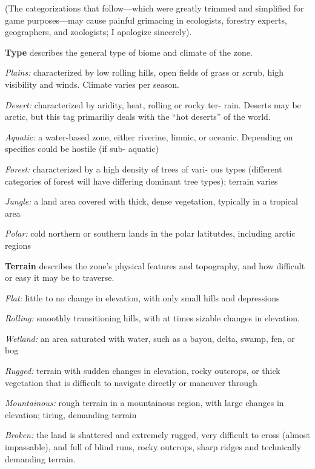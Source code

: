 \documentclass[oneside,10pt]{article}
\begin{document}
\begin{multicols}{2}
(The categorizations that follow—which were greatly trimmed
and simplified for game purposes—may cause painful grimacing in ecologists, forestry experts, geographers, and zoologists; I apologize sincerely).

\textbf{Type} describes the general type of biome and climate of the 
zone. 
\begin{dent}

\textit{Plains:} characterized by low rolling hills, open fields of 
grass or scrub, high visibility and winds. Climate varies per 
season. 

\textit{Desert:} characterized by aridity, heat, rolling or rocky ter- 
rain. Deserts may be arctic, but this tag primariliy deals 
with the ``hot deserts'' of the world. 

    \textit{Aquatic:} a water-based zone, either riverine, limnic, or 
    oceanic. Depending on specifics could be hostile (if sub- 
    aquatic) 

    \textit{Forest:} characterized by a high density of trees of vari- 
    ous types (different categories of forest will have differing 
    dominant tree types); terrain varies 

    \textit{Jungle:} a land area covered with thick, dense vegetation, 
    typically in a tropical area 

\textit{Polar:} cold northern or southern lands in the polar latitutdes, including arctic regions
\end{dent}

\textbf{Terrain} describes the zone’s physical features and topography, and how difficult or easy it may be to traverse.
\begin{dent}

\textit{Flat:} little to no change in elevation, with only small hills
and depressions

\textit{Rolling:} smoothly transitioning hills, with at times sizable
changes in elevation.

\textit{Wetland:} an area saturated with water, such as a bayou,
delta, swamp, fen, or bog

\textit{Rugged:} terrain with sudden changes in elevation, rocky
outcrops, or thick vegetation that is difficult to navigate
directly or maneuver through

\textit{Mountainous:} rough terrain in a mountainous region, with
large changes in elevation; tiring, demanding terrain

\textit{Broken:} the land is shattered and extremely rugged, very
difficult to cross (almost impassable), and full of blind runs,
rocky outcrops, sharp ridges and technically demanding
terrain.


\end{dent}
\end{multicols}
\end{document}

